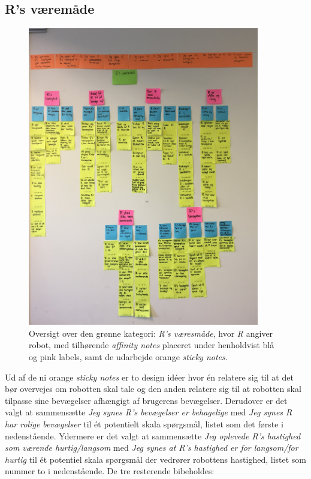 \subsection{R's væremåde}
\label{ParametreRsVaeremaade}
%
\begin{figure}[H]
\centering
\includegraphics[width = 0.9\textwidth]{Figure/AffinityDiagram/RsVaeremaade} 
\caption{Oversigt over den grønne kategori: \textit{R's væresmåde}, hvor \textit{R} angiver robot, med tilhørende \textit{affinity notes} placeret under henholdvist blå og pink labels, samt de udarbejde orange \textit{sticky notes}.}
\label{fig:AFRsVaeremaade}
\end{figure}
\noindent
%
Ud af de ni orange \textit{sticky notes} er to design idéer hvor én relatere sig til at det bør overvejes om robotten skal tale og den anden relatere sig til at robotten skal tilpasse sine bevægelser afhængigt af brugerens bevægelser. Derudover er det valgt at sammensætte \textit{Jeg synes R's bevægelser er behagelige} med \textit{Jeg synes R har rolige bevægelser} til ét potentielt skala spørgsmål, listet som det første i nedenstående. Ydermere er det valgt at sammensætte \textit{Jeg oplevede R's hastighed som værende hurtig/langsom} med \textit{Jeg synes at R's hastighed er for langsom/for hurtig} til ét potentiel skala spørgsmål der vedrører robottens hastighed, listet som nummer to i nedenstående. De tre resterende bibeholdes: \blankline 
